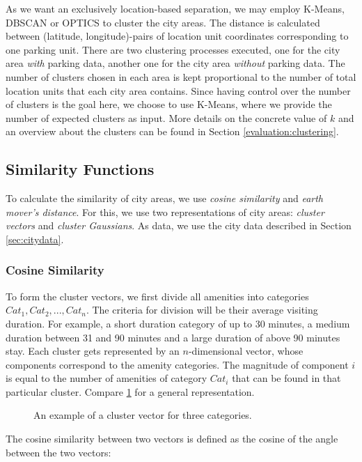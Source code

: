 As we want an exclusively location-based separation, we may employ K-Means, DBSCAN or OPTICS to cluster the city areas. The distance is calculated between (latitude, longitude)-pairs of location unit coordinates corresponding to one parking unit. There are two clustering processes executed, one for the city area \textit{with} parking data, another one for the city area \textit{without} parking data. The number of clusters chosen in each area is kept proportional to the number of total location units that each city area contains. Since having control over the number of clusters is the goal here, we choose to use K-Means, where we provide the number of expected clusters as input. More details on the concrete value of $k$ and an overview about the clusters can be found in Section \ref{evaluation:clustering}.

\subsection{Similarity Functions}
To calculate the similarity of city areas, we use \textit{cosine similarity} and \textit{earth mover's distance}. For this, we use two representations of city areas: \textit{cluster vectors} and \textit{cluster Gaussians}. As data, we use the city data described in Section \ref{sec:citydata}.

\subsubsection{Cosine Similarity}
\label{realization:vectors}
To form the cluster vectors, we first divide all amenities into categories $Cat_1, Cat_2, ..., Cat_n$.
The criteria for division will be their average visiting duration.
For example, a short duration category of up to 30 minutes, a medium duration between 31 and 90 minutes and a large duration of above 90 minutes stay.
Each cluster gets represented by an $n$-dimensional vector, whose components correspond to the amenity categories.
The magnitude of component $i$ is equal to the number of amenities of category $Cat_i$ that can be found in that particular cluster.
Compare \ref{fig:cluster_vector} for a general representation.

\begin{figure}[!ht]
	\centering
	
	\caption{An example of a cluster vector for three categories.}
	\label{fig:cluster_vector}
\end{figure}
\label{realization:cosine_similarity}
The cosine similarity between two vectors is defined as the cosine of the angle between the two vectors:

